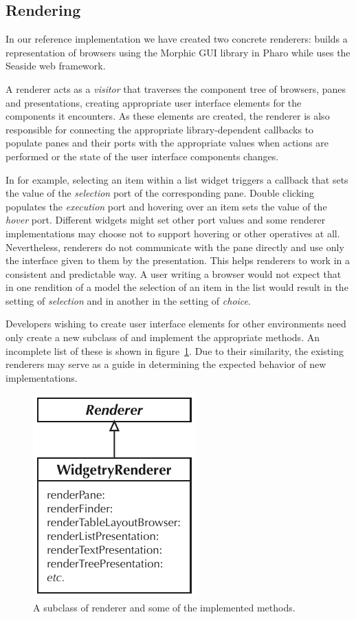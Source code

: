 \documentclass[a4paper,10pt,twoside]{book}
\begin{document}
\subsection{Rendering}
\label{sec:impl/rendering}

In our reference implementation we have created two concrete
renderers:  builds a representation of browsers
using the Morphic GUI library in Pharo while 
uses the Seaside web framework.

A renderer acts as a \emph{visitor} that traverses the
component tree of browsers, panes and presentations, creating
appropriate user interface elements for the components it
encounters. As these elements are created, the renderer is also
responsible for connecting the appropriate library-dependent callbacks
to populate panes and their ports with the appropriate values when
actions are performed or the state of the user interface components
changes.

In  for example, selecting an item within a list
widget triggers a callback that sets the value of the \emph{selection}
port of the corresponding pane. Double clicking populates the
\emph{execution} port and hovering over an item sets the value of the
\emph{hover} port. Different widgets might set other port values and
some renderer implementations may choose not to support hovering or
other operatives at all. Nevertheless, renderers do not communicate
with the pane directly and use only the interface given to them by the
presentation. This helps renderers to work in a consistent and
predictable way. A user writing a browser would not expect that in one
rendition of a model the selection of an item in the list would result
in the setting of \emph{selection} and in another in the setting of
\emph{choice}.

Developers wishing to create user interface elements for other
environments need only create a new subclass of  and
implement the appropriate methods. An incomplete list of these is
shown in figure~\ref{fig:renderer}. Due to their similarity, the
existing renderers may serve as a guide in determining the expected
behavior of new implementations.

\begin{figure}[htbp]
\centerline{\includegraphics[width=.2\linewidth]{renderer.pdf}}
\caption{A subclass of renderer and some of the implemented methods.}
\label{fig:renderer}
\end{figure}
\end{document}
